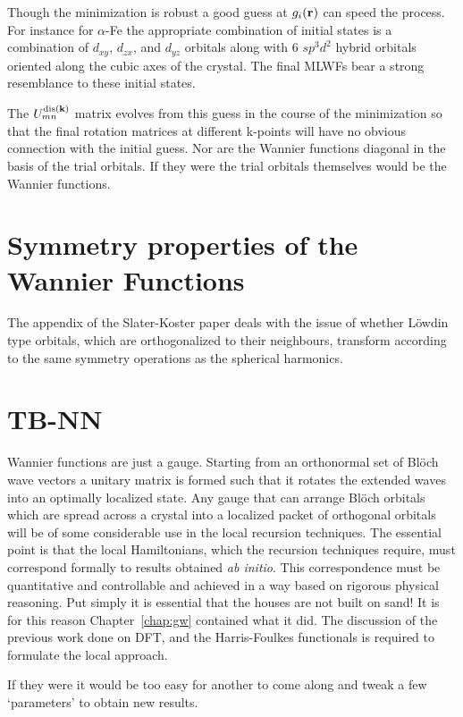 Though the minimization is robust a good guess at $g_{i}({\bf r})$ can speed the process.
For instance for $\alpha$-Fe the appropriate combination of initial states is a combination of 
$d_{xy}$, $d_{zx}$, and $d_{yz}$ orbitals along with 6 $sp^{3}d^{2}$ hybrid orbitals oriented along the 
cubic axes of the crystal. The final MLWFs bear a strong resemblance to these initial states.

The $U^{{\rm dis}({\bf k})}_{mn}$ matrix evolves from this guess in the course of the 
minimization so that the final rotation matrices at different k-points will have no 
obvious connection with the initial guess. Nor are the Wannier functions diagonal in the basis 
of the trial orbitals. If they were the trial orbitals themselves would be the Wannier functions. 

\section{Symmetry properties of the Wannier Functions}
The appendix of the Slater-Koster paper deals with the issue of whether L\"owdin type
orbitals, which are orthogonalized to their neighbours, transform according to the same
symmetry operations as the spherical harmonics.

\section{TB-NN}
Wannier functions are just a gauge. Starting from an orthonormal set
of Bl\"och wave vectors a unitary matrix is formed such that it rotates the
extended waves into an optimally localized state.
Any gauge that can arrange Bl\"och orbitals which are spread 
across a crystal into a localized
packet of orthogonal orbitals will be of some considerable use in the local recursion techniques.
The essential point is that the local Hamiltonians, which the recursion techniques require,
must correspond formally to results obtained {\it ab initio}. 
This correspondence must be quantitative and controllable and achieved in 
a way based on rigorous physical reasoning. 
Put simply it is essential that the houses are not built on sand! 
It is for this reason Chapter~\ref{chap:gw} contained what it did. The discussion of 
the previous work done on DFT, and the Harris-Foulkes functionals is required to formulate
the local approach.

If they were it would be too easy for another to come along and 
tweak a few `parameters' to obtain new results. 

